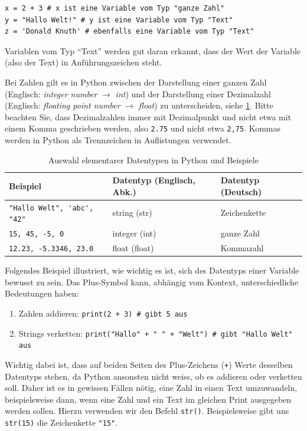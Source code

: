 \begin{lstlisting}
x = 2 + 3 # x ist eine Variable vom Typ "ganze Zahl"
y = "Hallo Welt!" # y ist eine Variable vom Typ "Text"
z = 'Donald Knuth' # ebenfalls eine Variable vom Typ "Text"
\end{lstlisting}

Variablen vom Typ \enquote{Text} werden gut daran erkannt, dass der Wert der Variable (also der Text) in Anführungszeichen steht.

Bei Zahlen gilt es in Python zwischen der Darstellung einer ganzen Zahl (Englisch: \emph{integer number} $\rightarrow$ \emph{int}) und der Darstellung einer Dezimalzahl (Englisch: \emph{floating point number} $\rightarrow$ \emph{float}) zu unterscheiden, siehe \cref{tab:datatypes}. Bitte beachten Sie, dass Dezimalzahlen immer mit Dezimalpunkt und nicht etwa mit einem Komma geschrieben werden, also \lstinline|2.75| und nicht etwa \lstinline|2,75|. Kommas werden in Python als Trennzeichen in Auflistungen verwendet.

\begin{table}[H]
	\footnotesize
	\centering
	\begin{tabular}{lll}
		\textbf{Beispiel}                     & \textbf{Datentyp (Englisch, Abk.)} & \textbf{Datentyp (Deutsch)} \\\midrule
		\lstinline|"Hallo Welt", 'abc', "42"| & string (str)                        & Zeichenkette                \\\midrule
		\lstinline|15, 45, -5, 0|             & integer (int)                       & ganze Zahl                  \\\midrule
		\lstinline|12.23, -5.3346, 23.0|      & float (float)                       & Kommazahl
	\end{tabular}
	\caption{Auswahl elementarer Datentypen in Python und Beispiele}
	\label{tab:datatypes}
\end{table}

Folgendes Beispiel illustriert, wie wichtig es ist, sich des Datentyps einer Variable bewusst zu sein. Das Plus-Symbol kann, abhängig vom Kontext, unterschiedliche Bedeutungen haben:
\begin{enumerate}
	\item Zahlen addieren: \lstinline|print(2 + 3) # gibt 5 aus|
	\item Strings verketten: \lstinline|print("Hallo" + " " + "Welt") # gibt "Hallo Welt" aus|
\end{enumerate}
Wichtig dabei ist, dass auf beiden Seiten des Plus-Zeichens (\lstinline|+|) Werte desselben Datentyps stehen, da Python ansonsten nicht weiss, ob es addieren oder verketten soll. Daher ist es in gewissen Fällen nötig, eine Zahl in einen Text umzuwandeln, beispielsweise dann, wenn eine Zahl und ein Text im gleichen Print ausgegeben werden sollen. Hierzu verwenden wir den Befehl \lstinline|str()|. Beispielsweise gibt uns \lstinline|str(15)| die Zeichenkette \lstinline|"15"|.


